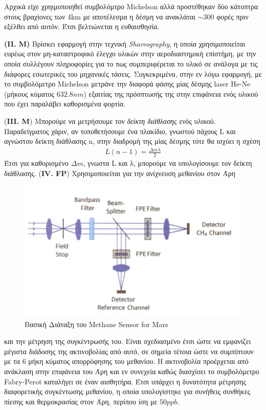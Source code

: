 \documentclass[a4paper]{article}
\begin{document}
Αρχικά είχε χρηιμοποιηθεί συμβολόμτρο Michelson αλλά προστέθηκαν δύο κάτοπτρα στους βραχίονες των 4km με αποτέλεσμα η δέσμη να ανακλάται $\sim300$ φορές πριν εξέλθει από αυτόν. Έτσι βελτιώνεται η ευθαισθησία. 

\textbf{(II. M)} Βρίσκει εφαρμογή στην τεχνική \textit{Shareography}, η οποία χρησιμοποιείται ευρέως στον μη-καταστροφικό έλεγχο υλικών στην αεροδιαστημική επίστήμη, με την οποία συλλέγουν πληροφορίες για το πως συμπεριφέρεται το υλικό σε ανάλογα με τις διάφορες εσωτερικές του μηχανικές τάσεις.
 Συγκεκριμένα, στην εν λόγω εφαρμογή, με το συμβολόμετρο Michelson μετράνε την διαφορά φάσης μίας δέσμης laser He-Ne (μήκους κύματος $632.8nm$) εξαιτίας της πρόσπτωσής της στην επιφάνεια ενός υλικού που έχει παραλάβει καθορισμένα φορτία.

(\textbf{III. M})  Μπορούμε να μετρήσουμε τον \textit{δείκτη διάθλασης} ενός υλικού. Παραδείγματος χάριν, αν τοποθετήσουμε ένα πλακίδιο, γνωστού πάχους L και αγνώστου δείκτη διάθλασης n, στην διαδρομή της μίας δέσμης τότε θα ισχύει  η σχέση  
\begin{align*}
L(n-1) = \frac{\Delta m\lambda}{2}
\end{align*}
Έτσι για καθορισμένο $\Delta m$, γνωστα L και λ, μπορούμε να υπολογίσουμε τον δείκτη διάθλασης.
\newpage
(\textbf{IV. FP})
 Χρησιμοποιείται για την ανίχνευση μεθανίου στον Άρη 
 \begin{figure}
\includegraphics[width=0.8\linewidth]{methane sensor mars.png} 
\caption{Βασική Διάταξη του Methane Sensor for Mars}
\end{figure}
και την μέτρηση της συγκέντρωσής του. Είναι σχεδιασμένο έτσι ώστε να εμφανίζει μέγιστα διάδοσης της ακτινοβολίας από αυτό, σε σημεία τέτοια ώστε να συμπίπτουν με τα 6 μήκη κύματος απορρόφησης του μεθανίου. Η ακτινοβολία προέρχεται από ανάκλαση στην επιφάνεια του Άρη και εν συνεχεία καθώς διασχίσει το συμβολόμετρο Fabry-Perot καταλήγει σε έναν αισθητήρα. Έτσι υπάρχει η δυνατότητα μέτρησης διαφορετικής συγκέντωσης μεθανίου, η οποία υπολογίστηκε για συνήθεις συνθήκες πίεσης και θερμοκρασίας στον Άρη, περίπου ίση με $50ppb$.
\end{document}
